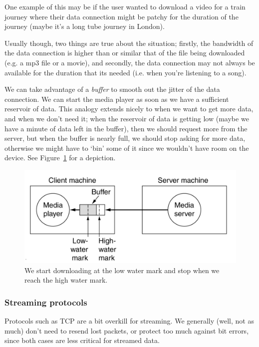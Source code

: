 One example of this may be if the user wanted to download a video for a train
journey where their data connection might be patchy for the duration of the
journey (maybe it's a long tube journey in London).


Usually though, two things are true about the situation; firstly, the bandwidth
of the data connection is higher than or similar that of the file being
downloaded (e.g. a mp3 file or a movie), and secondly, the data connection may
not always be available for the duration that its needed (i.e. when you're
listening to a song).

We can take advantage of a \textit{buffer} to smooth out the jitter of the data
connection. We can start the media player as soon as we have a sufficient
reservoir of data. This analogy extends nicely to when we want to get more data,
and when we don't need it; when the reservoir of data is getting low (maybe we
have a minute of data left in the buffer), then we should request more from the
server, but when the buffer is nearly full, we should stop asking for more data,
otherwise we might have to `bin' some of it since we wouldn't have room on the
device. See Figure~\ref{fig:buffers} for a depiction.

\begin{figure}[ht]
  \includegraphics[width=\textwidth]{images/buffer}
  \caption{We start downloading at the low water mark and stop when we reach the
  high water mark.}
  \label{fig:buffers}
\end{figure}

\subsubsection{Streaming protocols}

Protocols such as TCP are a bit overkill for streaming. We generally (well, not
as much) don't need to resend lost packets, or protect too much against bit
errors, since both cases are less critical for streamed data.

